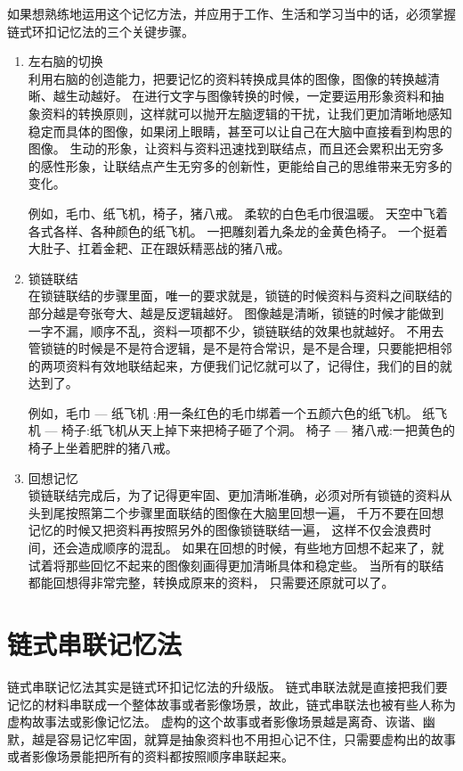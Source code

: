 如果想熟练地运用这个记忆方法，并应用于工作、生活和学习当中的话，必须掌握链式环扣记忆法的三个关键步骤。
\begin{enumerate}
\item 左右脑的切换\\
  利用右脑的创造能力，把要记忆的资料转换成具体的图像，图像的转换越清晰、越生动越好。
  在进行文字与图像转换的时候，一定要运用形象资料和抽象资料的转换原则，这样就可以抛开左脑逻辑的干扰，让我们更加清晰地感知稳定而具体的图像，如果闭上眼睛，甚至可以让自己在大脑中直接看到构思的图像。
  生动的形象，让资料与资料迅速找到联结点，而且还会累积出无穷多的感性形象，让联结点产生无穷多的创新性，更能给自己的思维带来无穷多的变化。

  例如，毛巾、纸飞机，椅子，猪八戒。
  柔软的白色毛巾很温暖。
  天空中飞着各式各样、各种颜色的纸飞机。
  一把雕刻着九条龙的金黄色椅子。
  一个挺着大肚子、扛着金耙、正在跟妖精恶战的猪八戒。
\item 锁链联结\\
  在锁链联结的步骤里面，唯一的要求就是，锁链的时候资料与资料之间联结的部分越是夸张夸大、越是反逻辑越好。
  图像越是清晰，锁链的时候才能做到一字不漏，顺序不乱，资料一项都不少，锁链联结的效果也就越好。
  不用去管锁链的时候是不是符合逻辑，是不是符合常识，是不是合理，只要能把相邻的两项资料有效地联结起来，方便我们记忆就可以了，记得住，我们的目的就达到了。

  例如，毛巾 — 纸飞机 :用一条红色的毛巾绑着一个五颜六色的纸飞机。
  纸飞机 — 椅子:纸飞机从天上掉下来把椅子砸了个洞。
  椅子 — 猪八戒:一把黄色的椅子上坐着肥胖的猪八戒。
\item 回想记忆\\
  锁链联结完成后，为了记得更牢固、更加清晰准确，必须对所有锁链的资料从头到尾按照第二个步骤里面联结的图像在大脑里回想一遍， 千万不要在回想记忆的时候又把资料再按照另外的图像锁链联结一遍， 这样不仅会浪费时间，还会造成顺序的混乱。
  如果在回想的时候，有些地方回想不起来了，就试着将那些回忆不起来的图像刻画得更加清晰具体和稳定些。
  当所有的联结都能回想得非常完整，转换成原来的资料， 只需要还原就可以了。
\end{enumerate}



\section{链式串联记忆法}

链式串联记忆法其实是链式环扣记忆法的升级版。
链式串联法就是直接把我们要记忆的材料串联成一个整体故事或者影像场景，故此，链式串联法也被有些人称为虚构故事法或影像记忆法。
虚构的这个故事或者影像场景越是离奇、诙谐、幽默，越是容易记忆牢固，就算是抽象资料也不用担心记不住，只需要虚构出的故事或者影像场景能把所有的资料都按照顺序串联起来。



